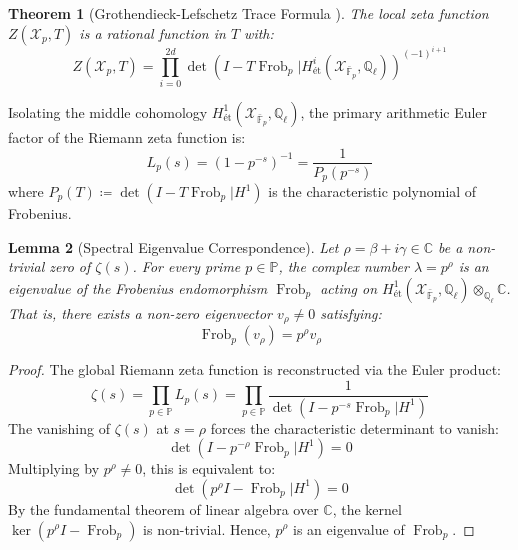 \documentclass[11pt,a4paper]{article}
\newtheorem{theorem}{Theorem}[section]
\newtheorem{lemma}[theorem]{Lemma}
\theoremstyle{definition}
\begin{document}
\begin{theorem}[Grothendieck-Lefschetz Trace Formula \cite{grothendieck1965}]\label{thm:grothendieck_trace}
The local zeta function $Z(\mathcal{X}_p, T)$ is a rational function in $T$ with:
\begin{equation}\label{eq:grothendieck_trace}
Z(\mathcal{X}_p, T) = \prod_{i=0}^{2d} \det\left( I - T \operatorname{Frob}_p \Big| H^i_{\text{ét}}(\mathcal{X}_{\bar{\mathbb{F}}_p}, \mathbb{Q}_\ell) \right)^{(-1)^{i+1}}
\end{equation}
\end{theorem}

Isolating the middle cohomology $H^1_{\text{ét}}(\mathcal{X}_{\bar{\mathbb{F}}_p}, \mathbb{Q}_\ell)$, the primary arithmetic Euler factor of the Riemann zeta function is:
\begin{equation}
L_p(s) = \left( 1 - p^{-s} \right)^{-1} = \frac{1}{P_p(p^{-s})}
\end{equation}
where $P_p(T) \coloneqq \det\left( I - T \operatorname{Frob}_p \Big| H^1 \right)$ is the characteristic polynomial of Frobenius.

\begin{lemma}[Spectral Eigenvalue Correspondence]\label{lem:spectral_zero_corresp}
Let $\rho = \beta + i\gamma \in \mathbb{C}$ be a non-trivial zero of $\zeta(s)$. For every prime $p \in \mathbb{P}$, the complex number $\lambda = p^\rho$ is an eigenvalue of the Frobenius endomorphism $\operatorname{Frob}_p$ acting on $H^1_{\text{ét}}(\mathcal{X}_{\bar{\mathbb{F}}_p}, \mathbb{Q}_\ell) \otimes_{\mathbb{Q}_\ell} \mathbb{C}$. That is, there exists a non-zero eigenvector $v_\rho \ne 0$ satisfying:
\begin{equation}\label{eq:frob_eigenvalue}
\operatorname{Frob}_p(v_\rho) = p^\rho v_\rho
\end{equation}
\end{lemma}

\begin{proof}
The global Riemann zeta function is reconstructed via the Euler product:
\begin{equation}
\zeta(s) = \prod_{p \in \mathbb{P}} L_p(s) = \prod_{p \in \mathbb{P}} \frac{1}{\det\left( I - p^{-s} \operatorname{Frob}_p \Big| H^1 \right)}
\end{equation}
The vanishing of $\zeta(s)$ at $s = \rho$ forces the characteristic determinant to vanish:
\begin{equation}
\det\left( I - p^{-\rho} \operatorname{Frob}_p \Big| H^1 \right) = 0
\end{equation}
Multiplying by $p^\rho \ne 0$, this is equivalent to:
\begin{equation}
\det\left( p^\rho I - \operatorname{Frob}_p \Big| H^1 \right) = 0
\end{equation}
By the fundamental theorem of linear algebra over $\mathbb{C}$, the kernel $\ker(p^\rho I - \operatorname{Frob}_p)$ is non-trivial. Hence, $p^\rho$ is an eigenvalue of $\operatorname{Frob}_p$.
\end{proof}
\end{document}
